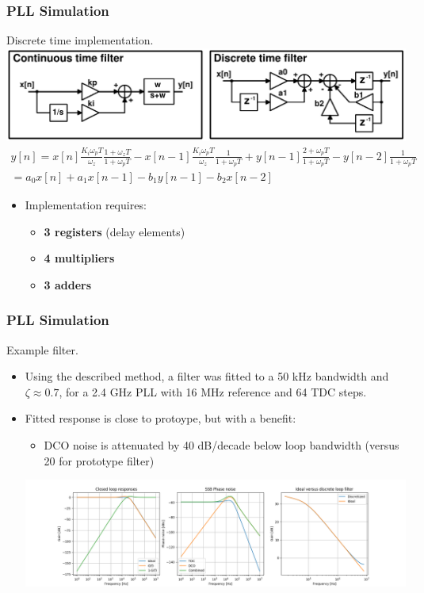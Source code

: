 \documentclass[t, screen, aspectratio=43]{beamer}
\begin{document}
\begin{frame}
	\frametitle{PLL Simulation}
	\begin{block}{Discrete time implementation.}
		\scriptsize
		\center\center\includegraphics[width=1\textwidth, angle=0]{filter_arch.pdf}
		\vspace{-2em}
		\begin{multline}
			y[n] = x[n]\frac{K_i\omega_pT}{\omega_z}\frac{1+\omega_zT}{1+\omega_pT} - x[n-1]\frac{K_i\omega_pT}{\omega_z}\frac{1}{1+\omega_pT} + y[n-1]\frac{2+\omega_pT}{1+\omega_pT} - y[n-2]\frac{1}{1+\omega_pT}\\
			= a_0x[n] + a_1x[n-1] - b_1y[n-1] - b_2x[n-2] 
		\end{multline}
		\vspace{-2em}
		\begin{itemize}
			\scriptsize
			\item Implementation requires:
			\begin{itemize}
				\scriptsize
				\item \textbf{3 registers} (delay elements)
				\item \textbf{4 multipliers}
				\item \textbf{3 adders}
			\end{itemize}
		\end{itemize} 	
	\end{block}
\end{frame}

\begin{frame}
	\frametitle{PLL Simulation}
	\begin{block}{Example filter.}
		\scriptsize
		\begin{itemize}
			\scriptsize
			\item Using the described method, a filter was fitted to a 50 kHz bandwidth and $\zeta \approx 0.7$, for a 2.4 GHz PLL with 16 MHz reference and 64 TDC steps.
			\item Fitted response is close to protoype, but with a benefit:
			\begin{itemize}
				\scriptsize
				\item DCO noise is attenuated by 40 dB/decade below loop bandwidth (versus 20 for prototype filter)
			\end{itemize}
			\hspace{-5em}\includegraphics[width=1.1\textwidth, angle=0]{pll_xfer_sim.png}
		\end{itemize} 	
	\end{block}
\end{frame}
\end{document}
